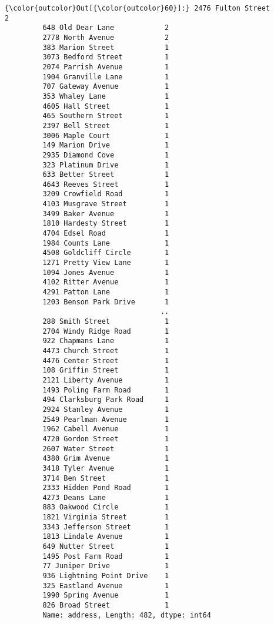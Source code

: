 \documentclass[11pt]{article}
\begin{document}
\begin{Verbatim}[commandchars=\\\{\}]
{\color{outcolor}Out[{\color{outcolor}60}]:} 2476 Fulton Street           2
         648 Old Dear Lane            2
         2778 North Avenue            2
         383 Marion Street            1
         3073 Bedford Street          1
         2074 Parrish Avenue          1
         1904 Granville Lane          1
         707 Gateway Avenue           1
         353 Whaley Lane              1
         4605 Hall Street             1
         465 Southern Street          1
         2397 Bell Street             1
         3006 Maple Court             1
         149 Marion Drive             1
         2935 Diamond Cove            1
         323 Platinum Drive           1
         633 Better Street            1
         4643 Reeves Street           1
         3209 Crowfield Road          1
         4103 Musgrave Street         1
         3499 Baker Avenue            1
         1810 Hardesty Street         1
         4704 Edsel Road              1
         1984 Counts Lane             1
         4508 Goldcliff Circle        1
         1271 Pretty View Lane        1
         1094 Jones Avenue            1
         4102 Ritter Avenue           1
         4291 Patton Lane             1
         1203 Benson Park Drive       1
                                     ..
         288 Smith Street             1
         2704 Windy Ridge Road        1
         922 Chapmans Lane            1
         4473 Church Street           1
         4476 Center Street           1
         108 Griffin Street           1
         2121 Liberty Avenue          1
         1493 Poling Farm Road        1
         494 Clarksburg Park Road     1
         2924 Stanley Avenue          1
         2549 Pearlman Avenue         1
         1962 Cabell Avenue           1
         4720 Gordon Street           1
         2607 Water Street            1
         4380 Grim Avenue             1
         3418 Tyler Avenue            1
         3714 Ben Street              1
         2333 Hidden Pond Road        1
         4273 Deans Lane              1
         883 Oakwood Circle           1
         1821 Virginia Street         1
         3343 Jefferson Street        1
         1813 Lindale Avenue          1
         649 Nutter Street            1
         1495 Post Farm Road          1
         77 Juniper Drive             1
         936 Lightning Point Drive    1
         325 Eastland Avenue          1
         1990 Spring Avenue           1
         826 Broad Street             1
         Name: address, Length: 482, dtype: int64
\end{Verbatim}
            
\end{document}
